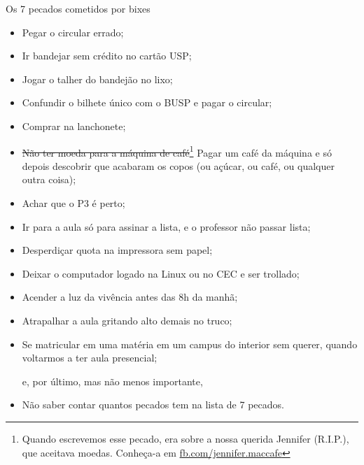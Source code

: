 \begin{editorial}{Os 7 pecados cometidos por bixes}
\begin{itemize}
  \item Pegar o circular errado;
  \item Ir bandejar sem crédito no cartão USP;
  \item Jogar o talher do bandejão no lixo;
  \item Confundir o bilhete único com o BUSP e pagar o circular;
  \item Comprar na lanchonete;
  \item \sout{Não ter moeda para a máquina de café}\footnote{Quando escrevemos
    esse pecado, era sobre a nossa querida Jennifer (R.I.P.), que aceitava
    moedas. Conheça-a em \url{fb.com/jennifer.maccafe}} Pagar um café da
    máquina e só depois descobrir que acabaram os copos (ou açúcar, ou café,
    ou qualquer outra coisa);
  \item Achar que o P3 é perto;
  \item Ir para a aula só para assinar a lista, e o professor não passar lista;
  \item Desperdiçar quota na impressora sem papel;
  \item Deixar o computador logado na Linux ou no CEC e ser trollado;
  \item Acender a luz da vivência antes das 8h da manhã;
  \item Atrapalhar a aula gritando alto demais no truco;
  \item Se matricular em uma matéria em um campus do interior sem querer, quando
        voltarmos a ter aula presencial;

e, por último, mas não menos importante,
\end{itemize}

\begin{itemize}
  \item Não saber contar quantos pecados tem na lista de 7 pecados.
\end{itemize}

\end{editorial}
